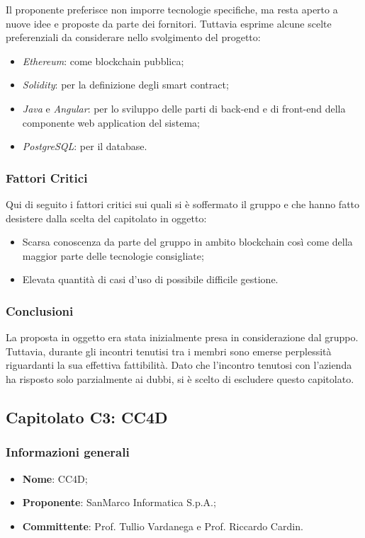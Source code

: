 \documentclass[11pt]{article}
\begin{document}
        \noindent
        Il proponente preferisce non imporre tecnologie specifiche, ma resta aperto a nuove idee e proposte da parte dei fornitori.
        Tuttavia esprime alcune scelte preferenziali da considerare nello svolgimento del progetto:	
        \begin{itemize}
		    \item \textit{Ethereum}: come blockchain pubblica;
		    \item \textit{Solidity}: per la definizione degli smart contract;
			\item \textit{Java} e \textit{Angular}: per lo sviluppo delle parti di back-end e di front-end della componente
			web application del sistema;
			\item \textit{PostgreSQL}: per il database.
		\end{itemize}
    
    \subsubsection{Fattori Critici}
    Qui di seguito i fattori critici sui quali si è soffermato il gruppo e che hanno fatto desistere dalla scelta del capitolato in
    oggetto:
   	\begin{itemize}
		\item Scarsa conoscenza da parte del gruppo in ambito blockchain così come della maggior parte delle tecnologie consigliate;
		\item Elevata quantità di casi d'uso di possibile difficile gestione.
	\end{itemize}
	
    \subsubsection{Conclusioni}
    La proposta in oggetto era stata inizialmente presa in considerazione dal gruppo. Tuttavia, durante gli incontri tenutisi tra i membri
    sono emerse perplessità riguardanti la sua effettiva fattibilità. Dato che l'incontro tenutosi con l'azienda ha risposto solo
    parzialmente ai dubbi, si è scelto di escludere questo capitolato. 
    
    \newpage


\subsection{Capitolato C3: CC4D}
    \subsubsection{Informazioni generali}
    \begin{itemize}
        \item \textbf{Nome}: CC4D;
        \item \textbf{Proponente}: SanMarco Informatica S.p.A.;
        \item \textbf{Committente}: Prof. Tullio Vardanega e Prof. Riccardo Cardin.
    \end{itemize}
    
\end{document}
